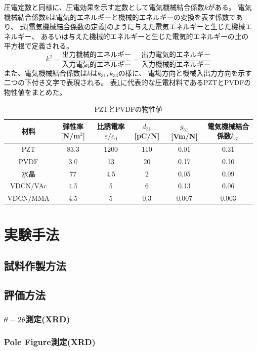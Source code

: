 \documentclass[dvipdfmx,12pt,a4paper]{jreport}
\begin{document}
			圧電定数と同様に、圧電効果を示す定数として電気機械結合係数$k$がある。
			電気機械結合係数$k$は電気的エネルギーと機械的エネルギーの変換を表す係数であり、
			式\ref{電気機械結合係数の定義}のように与えた電気エネルギーと生じた機械エネルギー、
			あるいは与えた機械的エネルギーと生じた電気的エネルギーの比の平方根で定義される。
			\begin{equation}
			k^2=\frac{\mbox{出力機械的エネルギー}}{\mbox{入力電気的エネルギー}}=
			\frac{\mbox{出力電気的エネルギー}}{\mbox{入力機械的エネルギー}}
			\label{電気機械結合係数の定義}
			\end{equation}
			また、電気機械結合係数は$k$は$k_{31}, k_{33}$の様に、
			電場方向と機械入出力方向を示す二つの下付き文字で表現される。
			表\ref{圧電材料}に代表的な圧電材料であるPZTとPVDFの物性値をまとめた。
			\begin{table}[h]
				\centering
				\caption{PZTとPVDFの物性値}
				\label{圧電材料}
				\begin{tabular}{c|ccccc}\hline
					材料&弾性率[N/m$^2$]&比誘電率$\varepsilon/\varepsilon_0$&$d_{31}$[pC/N]&$g_{31}$[Vm/N]&電気機械結合係数$k_{31}$ \\ \hline \hline
					PZT&83.3&1200&110&0.01&0.31 \\
					PVDF&3.0&13&20&0.17&0.10 \\ 
					水晶&77&4.5&2&0.05&0.09 \\
					VDCN/VAc&4.5&5&6&0.13&0.06 \\ 
					VDCN/MMA&4.5&5&0.3&0.007&0.003 \\ \hline
				\end{tabular} 
			\end{table}
	\chapter{実験手法}
		\section{試料作製方法}
		\section{評価方法}
			\subsection{$\theta - 2\theta$測定(XRD)}
			\subsection{Pole Figure測定(XRD)}
			
\end{document}
